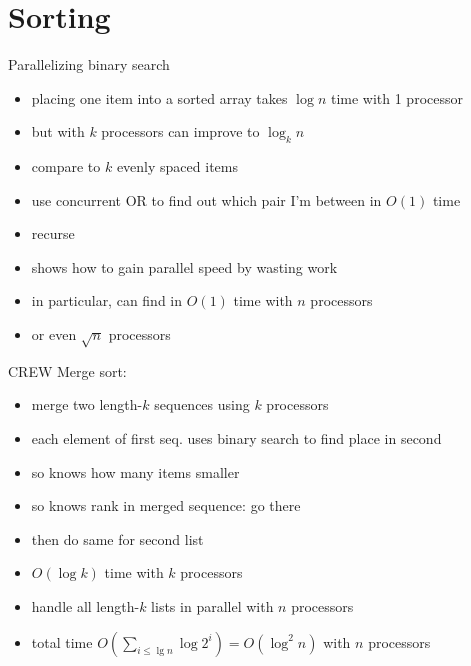 \documentclass[12pt]{article}
\begin{document}
\section*{Sorting}



Parallelizing binary search
\begin{itemize}
\item placing one item into a sorted array takes $\log n$ time with 1
  processor
\item but with $k$ processors can improve to $\log_k n$
\item compare to $k$ evenly spaced items
\item use concurrent OR to find out which pair I'm between in $O(1)$ time
\item recurse
\item shows how to gain parallel speed by wasting work
\item in particular, can find in $O(1)$ time with $n$ processors
\item or even $\sqrt{n}$ processors
\end{itemize}


CREW Merge sort:
\begin{itemize}
\item merge two length-$k$ sequences using $k$ processors
\item each element of first seq. uses binary search to find place in
  second
\item so knows how many items smaller
\item so knows rank in merged sequence: go there
\item then do same for second list
\item $O(\log k)$ time with $k$ processors
\item handle all length-$k$ lists in parallel with $n$ processors
\item total time $O(\sum_{i \le \lg n} \log 2^i)=O(\log^2 n)$ with $n$ processors
\end{itemize}
\end{document}
